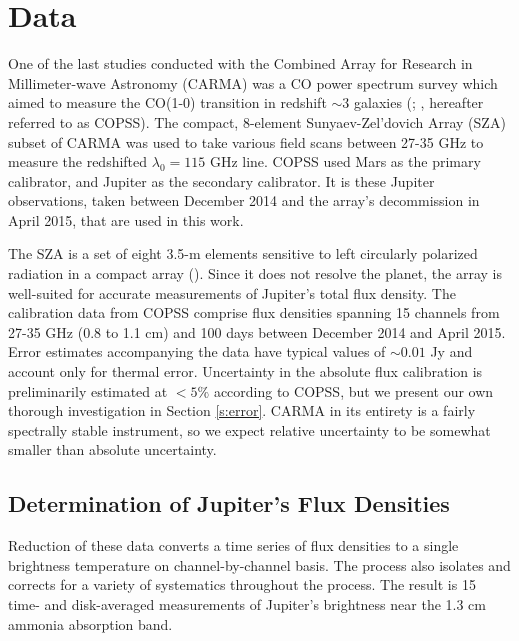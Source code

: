 \documentclass{article}
\begin{document}
\section{Data} \label{s:data}
	One of the last studies conducted with the Combined Array for Research in Millimeter-wave Astronomy (CARMA) was a CO power spectrum survey which aimed to measure the CO(1-0) transition in redshift $\sim 3$ galaxies (\citealt{2015ApJ...814..140K}; \citealt{2016ApJ...830...34K}, hereafter referred to as COPSS).
	The compact, 8-element Sunyaev-Zel'dovich Array (SZA) subset of CARMA was used to take various field scans between 27-35 GHz to measure the redshifted $\lambda_{0} = 115$ GHz line.
	COPSS used Mars as the primary calibrator, and Jupiter as the secondary calibrator.
	It is these Jupiter observations, taken between December 2014 and the array's decommission in April 2015, that are used in this work.

	The SZA is a set of eight 3.5-m elements sensitive to left circularly polarized radiation in a compact array (\citealt{2015ApJ...814..140K}).
	Since it does not resolve the planet, the array is well-suited for accurate measurements of Jupiter's total flux density.
	The calibration data from COPSS comprise flux densities spanning 15 channels from 27-35 GHz (0.8 to 1.1 cm) and 100 days between December 2014 and April 2015.
	Error estimates accompanying the data have typical values of $\sim0.01$ Jy and account only for thermal error.
	Uncertainty in the absolute flux calibration is preliminarily estimated at $<5\%$ according to COPSS, but we present our own thorough investigation in Section \ref{s:error}.
	CARMA in its entirety is a fairly spectrally stable instrument, so we expect relative uncertainty to be somewhat smaller than absolute uncertainty.

\subsection{Determination of Jupiter's Flux Densities} \label{}
	Reduction of these data converts a time series of flux densities to a single brightness temperature on channel-by-channel basis.
	The process also isolates and corrects for a variety of systematics throughout the process.
	The result is 15 time- and disk-averaged measurements of Jupiter's brightness near the 1.3 cm ammonia absorption band.
\end{document}
